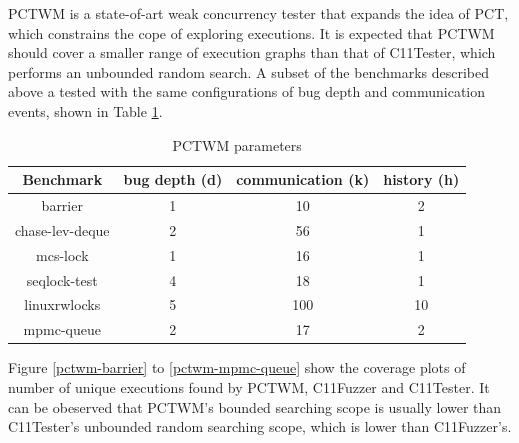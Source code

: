 PCTWM \cite{pctwm} is a state-of-art weak concurrency tester that expands the idea of PCT, which constrains the cope of exploring executions. It is expected that PCTWM should cover a smaller range of execution graphs than that of C11Tester, which performs an unbounded random search. A subset of the benchmarks described above a tested with the same configurations of bug depth and communication events, shown in Table \ref{pctwm-configs}. 

\begin{table}[h]
	\begin{tabular}{ |c|ccc| }
		\hline
		Benchmark  & bug depth (d) & communication (k) & history (h)  \\
		\hline 
		barrier   & 1    & 10        & 2              \\
		chase-lev-deque   & 2    & 56        & 1              \\
        mcs-lock        & 1  & 16  &  1 \\
        seqlock-test    & 4  &  18  &   1 \\
        linuxrwlocks    & 5  &  100 & 10    \\
        mpmc-queue      & 2  &  17  & 2 \\
		\hline
        
	\end{tabular}
	\caption{PCTWM parameters}
	\label{pctwm-configs}
\end{table}

Figure \ref{pctwm-barrier} to \ref{pctwm-mpmc-queue} show the coverage plots of number of unique executions found by PCTWM, C11Fuzzer and C11Tester. It can be obeserved that PCTWM's bounded searching scope is usually lower than C11Tester's unbounded random searching scope, which is lower than C11Fuzzer's.


